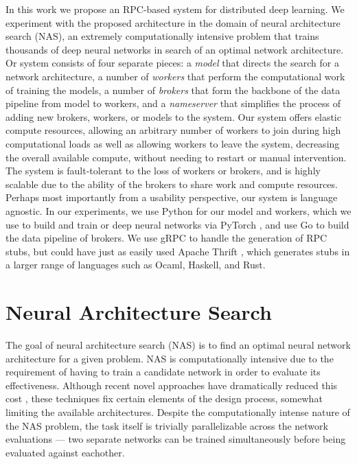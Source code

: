 \documentclass[conference]{IEEEtran}
\begin{document}
In this work we propose an RPC-based system for
distributed deep learning. We experiment with the proposed architecture in the domain
of neural architecture search (NAS), an extremely computationally intensive problem that
trains thousands of deep neural networks in search of an optimal network architecture.
Or system consists of four separate pieces: a \emph{model} that directs the search
for a network architecture, a number of \emph{workers} that perform the computational
work of training the models, a number of \emph{brokers} that form the backbone of
the data pipeline from model to workers, and a \emph{nameserver} that simplifies the
process of adding new brokers, workers, or models to the system. Our system offers
elastic compute resources, allowing an arbitrary number of workers to join during
high computational loads as well as allowing workers to leave the system, decreasing
the overall available compute, without needing to restart or manual intervention.
The system is fault-tolerant to the loss of workers or brokers, and is highly scalable
due to the ability of the brokers to share work and compute resources. Perhaps most
importantly from a usability perspective, our system is language agnostic. In our
experiments, we use Python for our model and workers, which we use to build and train
or deep neural networks via PyTorch \cite{paszke2017automatic}, and use Go to build
the data pipeline of brokers. We use gRPC \cite{Wang:1993:GCC:155870.155881} to handle
the generation of RPC stubs, but could have just as easily used Apache Thrift
\cite{Slee2007}, which generates stubs in a larger range of languages such as Ocaml,
Haskell, and Rust.

\section{Neural Architecture Search}
The goal of neural architecture search (NAS) is to find an optimal neural network
architecture for a given problem. NAS is computationally intensive due to the
requirement of having to train a candidate network in order to evaluate its
effectiveness. Although recent novel approaches have dramatically reduced this
cost \cite{DBLP:journals/corr/abs-1708-05344, pmlr-v80-pham18a}, these techniques
fix certain elements of the design process, somewhat limiting the available
architectures. Despite the computationally intense nature of the NAS problem,
the task itself is trivially parallelizable across the network evaluations ---
two separate networks can be trained simultaneously before being evaluated against
eachother.
\end{document}
